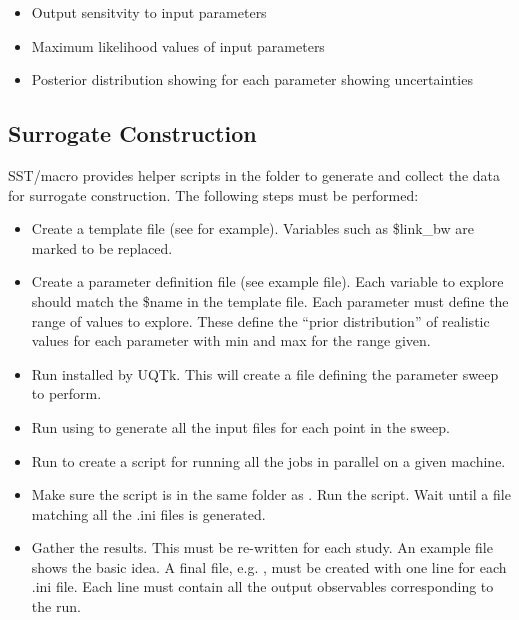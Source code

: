 \begin{itemize}
\item Output sensitvity to input parameters
\item Maximum likelihood values of input parameters
\item Posterior distribution showing for each parameter showing uncertainties
\end{itemize}

\subsection{Surrogate Construction}
\label{subsec:surrogateConstruction}
SST/macro provides helper scripts in the folder  to generate and collect the data for surrogate construction.
The following steps must be performed:

\begin{itemize}
\item Create a template file (see  for example). Variables such as \$link\_bw are marked to be replaced.
\item Create a parameter definition file (see  example file). Each variable to explore should match the \$name in the template file. Each parameter must define the range of values to explore. These define the ``prior distribution'' of realistic values for each parameter with min and max for the range given.
\item Run  installed by UQTk. This will create a file  defining the parameter sweep to perform.
\item Run  using  to generate all the input  files for each point in the sweep.
\item Run  to create a script  for running all the jobs in parallel on a given machine.
\item Make sure the  script is in the same folder as . Run the  script. Wait until a  file matching all the .ini files is generated.
\item Gather the results. This must be re-written for each study. An example file  shows the basic idea. A final file, e.g. , must be 
created with one line for each .ini file.  Each line must contain all the output observables corresponding to the run.
\end{itemize}

